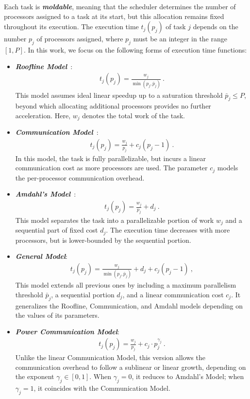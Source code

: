 \documentclass{article}
\begin{document}
Each task is \textbf{\emph{moldable}}, meaning that the scheduler determines the number of processors assigned to a task at its start, but this allocation remains fixed throughout its execution. The execution time $t_j(p_j)$ of task $j$ depends on the number $p_j$ of processors assigned, where $p_j$ must be an integer in the range $[1, P]$. In this work, we focus on the following forms of execution time functions:
\begin{itemize}

\item \emph{\textbf{Roofline Model}}~\cite{Williams2009}:
\begin{align}
\label{eq.model.roof}
t_j(p_j) = \frac{w_j}{\min(p_j, \bar{p}_j)} \ .
\end{align}
This model assumes ideal linear speedup up to a saturation threshold $\bar{p}_j \le P$, beyond which allocating additional processors provides no further acceleration. Here, $w_j$ denotes the total work of the task.

\item \emph{\textbf{Communication Model}}~\cite{Havill08_SET}:
\begin{align}
\label{eq.model.comm}
t_j(p_j) = \frac{w_j}{p_j} + c_j (p_j - 1) \ .
\end{align}
In this model, the task is fully parallelizable, but incurs a linear communication cost as more processors are used. The parameter $c_j$ models the per-processor communication overhead.

\item \emph{\textbf{Amdahl's Model}}~\cite{Amdahl67}:
\begin{align}
\label{eq.model.amdahl}
t_j(p_j) = \frac{w_j}{p_j} + d_j \ .
\end{align}
This model separates the task into a parallelizable portion of work $w_j$ and a sequential part of fixed cost $d_j$. The execution time decreases with more processors, but is lower-bounded by the sequential portion.

\item \emph{\textbf{General Model}}:
\begin{align}
\label{eq.exec_time}
t_j(p_j) = \frac{w_j}{\min(p_j, \bar{p}_j)} + d_j + c_j (p_j - 1) \ ,
\end{align}
This model extends all previous ones by including a maximum parallelism threshold $\bar{p}_j$, a sequential portion $d_j$, and a linear communication cost $c_j$. It generalizes the Roofline, Communication, and Amdahl models depending on the values of its parameters.

\item \emph{\textbf{Power Communication Model}}:
\begin{align}
\label{eq.model.powcomm}
t_j(p_j) = \frac{w_j}{p_j} + c_j \cdot p_j^{\gamma_j} \ .
\end{align}
Unlike the linear Communication Model, this version allows the communication overhead to follow a sublinear or linear growth, depending on the exponent $\gamma_j \in [0,1]$. When $\gamma_j = 0$, it reduces to Amdahl’s Model; when $\gamma_j = 1$, it coincides with the Communication Model.
\end{itemize}
\end{document}
